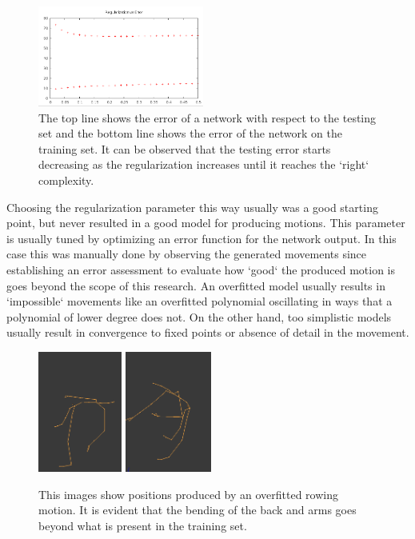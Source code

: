 \documentclass[letterpaper,9pt]{article}
\begin{document}
\begin{figure}[h!]
  \centering
    \includegraphics[height=125px]{Extra/regularization_vs_error.png}
    \caption[Error and Regularization]{The top line shows the error of a network with respect to the testing set and the bottom line shows the error of the network on the training set. It can be observed that the testing error starts decreasing as the regularization increases until it reaches the `right` complexity.}
\end{figure}

Choosing the regularization parameter this way usually was a good starting point, but never resulted in a good model for producing motions. This parameter is usually tuned by optimizing an error function for the network output. In this case this was manually done by observing the generated movements since establishing an error assessment to evaluate how `good` the produced motion is goes beyond the scope of this research. An overfitted model usually results in `impossible` movements like an overfitted polynomial oscillating in ways that a polynomial of lower degree does not. On the other hand, too simplistic models usually result in convergence to fixed points or absence of detail in the movement.

\begin{figure}[h!]
  \centering
  \includegraphics[height=150px]{Extra/overfitting_1.png}
  \includegraphics[height=150px]{Extra/overfitting_2.png}
  \caption[Error and Regularization]{This images show positions produced by an overfitted rowing motion. It is evident that the bending of the back and arms goes beyond what is present in the training set.}
\end{figure}
\end{document}
